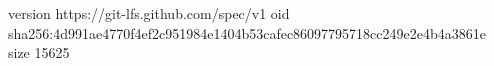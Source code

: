version https://git-lfs.github.com/spec/v1
oid sha256:4d991ae4770f4ef2c951984e1404b53cafec86097795718cc249e2e4b4a3861e
size 15625
